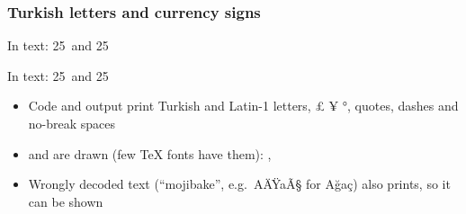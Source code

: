 \documentclass[aspectratio=169,10pt,compress]{beamer}
\begin{document}
\begin{frame}[t,fragile] \frametitle{Turkish letters and currency signs}

\begin{texcode}
In text: 25\,\hbLira{} and 25\,\hbRupee{}
\end{texcode}


	\small In text: 25\,\hbLira{} and 25\,\hbRupee{}

	\begin{itemize}\footnotesize
		\item Code and output print Turkish and Latin-1 letters, \texteuro{} £ ¥ °, quotes, dashes and no-break spaces
		\item \hbLira{} and \hbRupee{} are drawn (few TeX fonts have them): , 
		\item Wrongly decoded text (``mojibake'', e.g.\ AÄŸaÃ§ for Ağaç) also prints, so it can be shown
	\end{itemize}
\end{frame}
\end{document}
